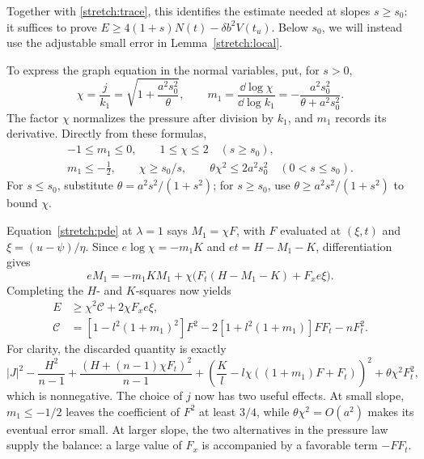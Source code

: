 Together with \eqref{stretch:trace}, this identifies the estimate needed
at slopes $s\ge s_0$: it suffices to prove
$E\ge4(1+s)N(t)-\delta b^2V(t_u)$.  Below $s_0$, we will instead use
the adjustable small error in Lemma~\ref{stretch:local}.

To express the graph equation in the normal variables, put, for $s>0$,
\begin{equation}\label{stretch:chi}
 \chi=\frac{j}{k_1}=\sqrt{1+\frac{a^2s_0^2}{\theta}},\qquad
 m_1=\frac{\dd\log\chi}{\dd\log k_1}
       =-\frac{a^2s_0^2}{\theta+a^2s_0^2}.
\end{equation}
The factor $\chi$ normalizes the pressure after division by $k_1$, and
$m_1$ records its derivative.  Directly from these formulas,
\begin{equation}\label{stretch:slope-bounds}
 \begin{gathered}
 -1\le m_1\le0,\qquad 1\le\chi\le2\quad(s\ge s_0),\\
 m_1\le-\tfrac12,\qquad \chi\ge s_0/s,\qquad
 \theta\chi^2\le2a^2s_0^2\quad(0<s\le s_0).
 \end{gathered}
\end{equation}
For $s\le s_0$, substitute $\theta=a^2s^2/(1+s^2)$; for $s\ge s_0$,
use $\theta\ge a^2s^2/(1+s^2)$ to bound $\chi$.

Equation~\eqref{stretch:pde} at $\lambda=1$ says
$M_1=\chi F$, with $F$ evaluated at $(\xi,t)$ and
$\xi=(u-\psi)/\eta$.  Since $e\log\chi=-m_1K$ and
$et=H-M_1-K$, differentiation gives
\[
 eM_1=-m_1KM_1+
       \chi\bigl(F_t(H-M_1-K)+F_xe\xi\bigr).
\]
Completing the $H$- and $K$-squares now yields
\begin{equation}\label{stretch:square-estimate}
 \begin{split}
 E&\ge\chi^2\mathcal C+2\chi F_xe\xi,\\
 \mathcal C&=
 [1-l^2(1+m_1)^2]F^2
 -2[1+l^2(1+m_1)]FF_t-nF_t^2.
 \end{split}
\end{equation}
For clarity, the discarded quantity is exactly
\[
 |J|^2-\frac{H^2}{n-1}
 +\frac{(H+(n-1)\chi F_t)^2}{n-1}
 +\left(\frac K l-l\chi((1+m_1)F+F_t)\right)^2
 +\theta\chi^2F_t^2,
\]
which is nonnegative.  The choice of $j$ now has two useful effects.
At small slope, $m_1\le-1/2$ leaves the coefficient of $F^2$ at least
$3/4$, while $\theta\chi^2=O(a^2)$ makes its eventual error small.
At larger slope, the two alternatives in the pressure law supply the
balance: a large value of $F_x$ is accompanied by a favorable term
$-FF_t$.

